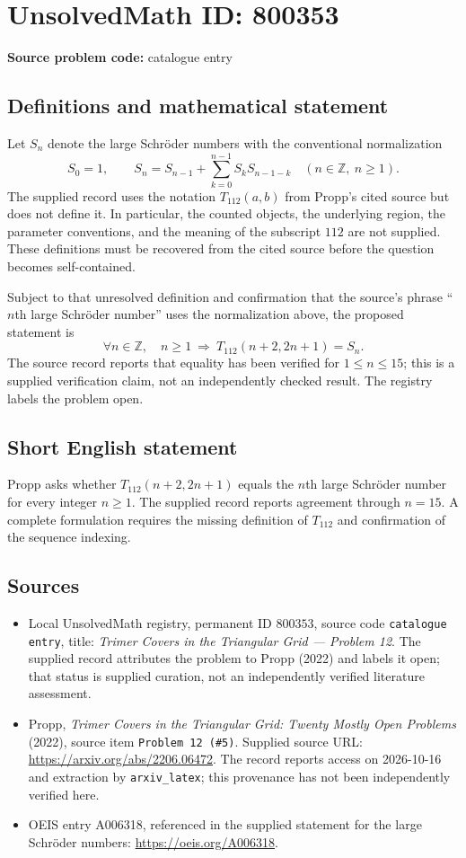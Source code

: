 \documentclass[11pt]{article}
\newcommand{\Z}{\mathbb{Z}}
\begin{document}
\section*{UnsolvedMath ID: 800353}
\textbf{Source problem code:} catalogue entry
\subsection{Definitions and mathematical statement}
Let \(S_n\) denote the large Schr\"oder numbers with the conventional normalization
\[
S_0=1,\qquad S_n=S_{n-1}+\sum_{k=0}^{n-1}S_kS_{n-1-k}\quad(n\in\Z,\ n\geq1).
\]
The supplied record uses the notation \(T_{112}(a,b)\) from Propp's cited source but does not define it. In particular, the counted objects, the underlying region, the parameter conventions, and the meaning of the subscript \(112\) are not supplied. These definitions must be recovered from the cited source before the question becomes self-contained.

Subject to that unresolved definition and confirmation that the source's phrase ``\(n\)th large Schr\"oder number'' uses the normalization above, the proposed statement is
\[
\forall n\in\Z,\quad n\geq1\ \Longrightarrow\ T_{112}(n+2,2n+1)=S_n.
\]
The source record reports that equality has been verified for \(1\leq n\leq15\); this is a supplied verification claim, not an independently checked result. The registry labels the problem open.
\subsection{Short English statement}
Propp asks whether \(T_{112}(n+2,2n+1)\) equals the \(n\)th large Schr\"oder number for every integer \(n\geq1\). The supplied record reports agreement through \(n=15\). A complete formulation requires the missing definition of \(T_{112}\) and confirmation of the sequence indexing.
\subsection{Sources}
\begin{itemize}
\item Local UnsolvedMath registry, permanent ID \(800353\), source code \texttt{catalogue entry}, title: \emph{Trimer Covers in the Triangular Grid --- Problem 12}. The supplied record attributes the problem to Propp (2022) and labels it open; that status is supplied curation, not an independently verified literature assessment.
\item Propp, \emph{Trimer Covers in the Triangular Grid: Twenty Mostly Open Problems} (2022), source item \texttt{Problem 12 (\#5)}. Supplied source URL: \url{https://arxiv.org/abs/2206.06472}. The record reports access on 2026-10-16 and extraction by \texttt{arxiv\_latex}; this provenance has not been independently verified here.
\item OEIS entry A006318, referenced in the supplied statement for the large Schr\"oder numbers: \url{https://oeis.org/A006318}.
\end{itemize}
\end{document}
